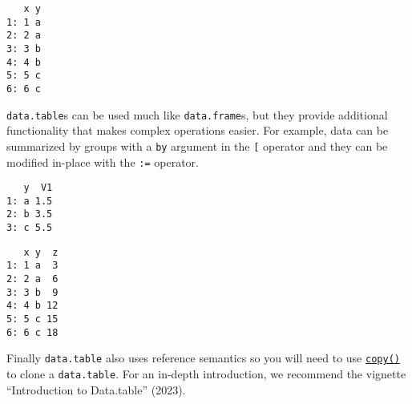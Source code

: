 \begin{Shaded}
\begin{Highlighting}[]
\OtherTok{=} \NormalTok{(} \SpecialCharTok{:}\NormalTok{, } \NormalTok{(letters[}\SpecialCharTok{:}\NormalTok{], } \NormalTok{))}
\end{Highlighting}
\end{Shaded}

\begin{verbatim}
   x y
1: 1 a
2: 2 a
3: 3 b
4: 4 b
5: 5 c
6: 6 c
\end{verbatim}

\texttt{data.table}s can be used much like \texttt{data.frame}s, but
they provide additional functionality that makes complex operations
easier. For example, data can be summarized by groups with a \texttt{by}
argument in the \texttt{{[}} operator and they can be modified in-place
with the \texttt{:=} operator.

\begin{Shaded}
\begin{Highlighting}[]
\NormalTok{dt[, }\OtherTok{=} \NormalTok{]}
\end{Highlighting}
\end{Shaded}

\begin{verbatim}
   y  V1
1: a 1.5
2: b 3.5
3: c 5.5
\end{verbatim}

\begin{Shaded}
\begin{Highlighting}[]
\NormalTok{dt[, z }\SpecialCharTok{:}\ErrorTok{=}\SpecialCharTok{*} \NormalTok{]}
\end{Highlighting}
\end{Shaded}

\begin{verbatim}
   x y  z
1: 1 a  3
2: 2 a  6
3: 3 b  9
4: 4 b 12
5: 5 c 15
6: 6 c 18
\end{verbatim}

Finally \texttt{data.table} also uses reference semantics so you will
need to use
\href{https://www.rdocumentation.org/packages/data.table/topics/copy}{\texttt{copy()}}
to clone a \texttt{data.table}. For an in-depth introduction, we
recommend the vignette {``Introduction to Data.table''} (2023).

